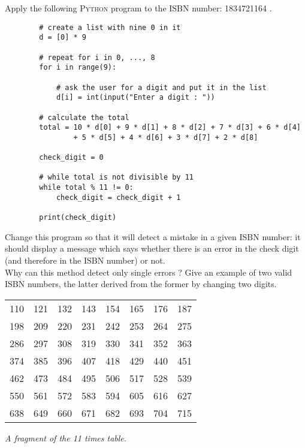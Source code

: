 \documentclass[12pt,a4paper]{nsi}
\begin{document}
\question Apply the following \textsc{Python} program to the ISBN number: 1834721164 .
\newpage
\begin{pyc}
    \begin{verbatim}
        # create a list with nine 0 in it
        d = [0] * 9

        # repeat for i in 0, ..., 8
        for i in range(9):
        
            # ask the user for a digit and put it in the list
            d[i] = int(input("Enter a digit : "))
        
        # calculate the total
        total = 10 * d[0] + 9 * d[1] + 8 * d[2] + 7 * d[3] + 6 * d[4] 
                + 5 * d[5] + 4 * d[6] + 3 * d[7] + 2 * d[8]
       
        check_digit = 0
        
        # while total is not divisible by 11
        while total % 11 != 0:
            check_digit = check_digit + 1
        
        print(check_digit)
    \end{verbatim}
\end{pyc}

\question Change this program so that it will detect a mistake in a given ISBN number: it should display a message which says whether there is an error in the check digit (and therefore in the ISBN number) or not.\\

\question Why can this method detect only single errors ? Give an example of two valid ISBN numbers, the latter derived from the former by changing two digits.\\

\begin{center}
    

\tabstyle[UGLiBlue]
\begin{tabular}{|c|c|c|c|c|c|c|c|}
    110 & 121 & 132 & 143 & 154 & 165 & 176 & 187 \\
    198 & 209 & 220 & 231 & 242 & 253 & 264 & 275 \\
    286 & 297 & 308 & 319 & 330 & 341 & 352 & 363 \\
    374 & 385 & 396 & 407 & 418 & 429 & 440 & 451 \\
    462 & 473 & 484 & 495 & 506 & 517 & 528 & 539 \\
    550 & 561 & 572 & 583 & 594 & 605 & 616 & 627 \\
    638 & 649 & 660 & 671 & 682 & 693 & 704 & 715 
\end{tabular}\bigskip\par \textit{A fragment of the 11 times table.} 
\end{center}
\end{document}
